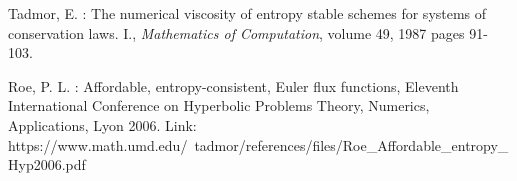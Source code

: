 Tadmor, E. : The numerical viscosity of entropy stable schemes for systems of conservation laws. I., \textit{Mathematics of Computation}, volume 49, 1987 pages 91-103.

Roe, P. L. : Affordable, entropy-consistent, Euler flux functions, Eleventh International Conference on
Hyperbolic Problems Theory, Numerics, Applications, Lyon 2006. Link: https://www.math.umd.edu/~tadmor/references/files/Roe\_Affordable\_entropy\_Hyp2006.pdf